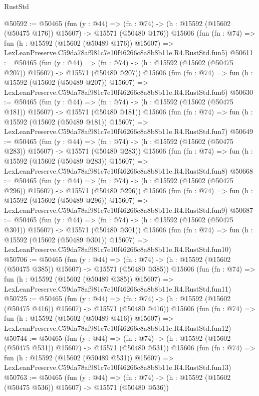 \begin{lexlean}{RustStd}
\begin{coremodule}
@50592 := @50465
    (fun (y : @44) =>
    (fn : @74) -> (h : @15592 (@15602 (@50475 @176)) @15607) -> @15571 (@50480 @176))
    @15606
    (fun (fn : @74) =>
    fun (h : @15592 (@15602 (@50489 @176)) @15607) =>
    LexLeanPreserve.C59da78af981c7e10f46266c8a8b8b11e.R4.RustStd.fun5)
@50611 := @50465
    (fun (y : @44) =>
    (fn : @74) -> (h : @15592 (@15602 (@50475 @207)) @15607) -> @15571 (@50480 @207))
    @15606
    (fun (fn : @74) =>
    fun (h : @15592 (@15602 (@50489 @207)) @15607) =>
    LexLeanPreserve.C59da78af981c7e10f46266c8a8b8b11e.R4.RustStd.fun6)
@50630 := @50465
    (fun (y : @44) =>
    (fn : @74) -> (h : @15592 (@15602 (@50475 @181)) @15607) -> @15571 (@50480 @181))
    @15606
    (fun (fn : @74) =>
    fun (h : @15592 (@15602 (@50489 @181)) @15607) =>
    LexLeanPreserve.C59da78af981c7e10f46266c8a8b8b11e.R4.RustStd.fun7)
@50649 := @50465
    (fun (y : @44) =>
    (fn : @74) -> (h : @15592 (@15602 (@50475 @283)) @15607) -> @15571 (@50480 @283))
    @15606
    (fun (fn : @74) =>
    fun (h : @15592 (@15602 (@50489 @283)) @15607) =>
    LexLeanPreserve.C59da78af981c7e10f46266c8a8b8b11e.R4.RustStd.fun8)
@50668 := @50465
    (fun (y : @44) =>
    (fn : @74) -> (h : @15592 (@15602 (@50475 @296)) @15607) -> @15571 (@50480 @296))
    @15606
    (fun (fn : @74) =>
    fun (h : @15592 (@15602 (@50489 @296)) @15607) =>
    LexLeanPreserve.C59da78af981c7e10f46266c8a8b8b11e.R4.RustStd.fun9)
@50687 := @50465
    (fun (y : @44) =>
    (fn : @74) -> (h : @15592 (@15602 (@50475 @301)) @15607) -> @15571 (@50480 @301))
    @15606
    (fun (fn : @74) =>
    fun (h : @15592 (@15602 (@50489 @301)) @15607) =>
    LexLeanPreserve.C59da78af981c7e10f46266c8a8b8b11e.R4.RustStd.fun10)
@50706 := @50465
    (fun (y : @44) =>
    (fn : @74) -> (h : @15592 (@15602 (@50475 @385)) @15607) -> @15571 (@50480 @385))
    @15606
    (fun (fn : @74) =>
    fun (h : @15592 (@15602 (@50489 @385)) @15607) =>
    LexLeanPreserve.C59da78af981c7e10f46266c8a8b8b11e.R4.RustStd.fun11)
@50725 := @50465
    (fun (y : @44) =>
    (fn : @74) -> (h : @15592 (@15602 (@50475 @416)) @15607) -> @15571 (@50480 @416))
    @15606
    (fun (fn : @74) =>
    fun (h : @15592 (@15602 (@50489 @416)) @15607) =>
    LexLeanPreserve.C59da78af981c7e10f46266c8a8b8b11e.R4.RustStd.fun12)
@50744 := @50465
    (fun (y : @44) =>
    (fn : @74) -> (h : @15592 (@15602 (@50475 @531)) @15607) -> @15571 (@50480 @531))
    @15606
    (fun (fn : @74) =>
    fun (h : @15592 (@15602 (@50489 @531)) @15607) =>
    LexLeanPreserve.C59da78af981c7e10f46266c8a8b8b11e.R4.RustStd.fun13)
@50763 := @50465
    (fun (y : @44) =>
    (fn : @74) -> (h : @15592 (@15602 (@50475 @536)) @15607) -> @15571 (@50480 @536))

\end{coremodule}
\end{lexlean}
